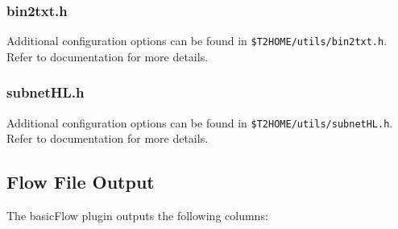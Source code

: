 \documentclass[documentation]{subfiles}
\begin{document}
\subsubsection{bin2txt.h}
Additional configuration options can be found in {\tt \$T2HOME/utils/bin2txt.h}.
Refer to  documentation for more details.

\subsubsection{subnetHL.h}
Additional configuration options can be found in {\tt \$T2HOME/utils/subnetHL.h}.
Refer to  documentation for more details.

\subsection{Flow File Output}
The basicFlow plugin outputs the following columns:
\end{document}
